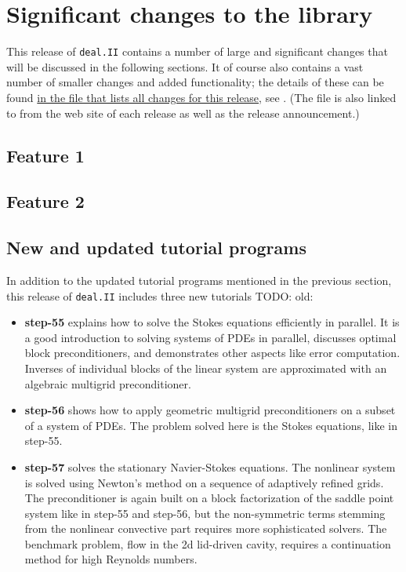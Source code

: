 \documentclass{ansarticle-preprint}
\newcommand{\specialword}[1]{\texttt{#1}}
\newcommand{\dealii}{{\specialword{deal.II}}}
\begin{document}
\section{Significant changes to the library}

This release of \dealii{} contains a number of large and significant changes
that will be discussed in the following sections. It of course also contains a
vast number of smaller changes and added functionality; the details of these
can be found
\href{https://www.dealii.org/developer/doxygen/deal.II/changes_between_8_5_and_9_0.html}{
in the file that lists all changes for this release}, see \cite{changes90}.
(The file is also linked to from the web site of each release as well as
the release announcement.)


\subsection{Feature 1}

\subsection{Feature 2}


\subsection{New and updated tutorial programs}
In addition to the updated tutorial programs mentioned in the previous
section, this release of \dealii{} includes three new tutorials TODO: old:
\begin{itemize}
 \item {\bf step-55} explains how to solve the Stokes
 equations efficiently in parallel. It is a good introduction to solving
 systems of PDEs in parallel, discusses optimal block
 preconditioners, and demonstrates other aspects like error computation.
 Inverses of individual blocks of the linear system are approximated with an algebraic
 multigrid preconditioner.

 \item {\bf step-56} shows how to apply geometric multigrid
 preconditioners on a subset of a system of PDEs. The problem solved here is the
 Stokes equations, like in step-55.

 \item {\bf step-57} solves the stationary Navier-Stokes equations.
 The nonlinear system is solved using Newton's method on a sequence of adaptively refined
 grids. The preconditioner is again built on a block factorization of the saddle point
 system like in step-55 and step-56, but the non-symmetric terms stemming from the
 nonlinear convective part requires more sophisticated solvers. The benchmark problem,
 flow in the 2d lid-driven cavity, requires a continuation method for high Reynolds
 numbers.
 \end{itemize}
\end{document}
